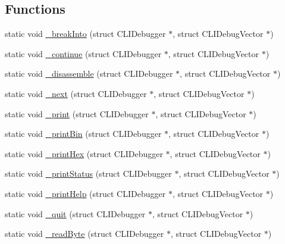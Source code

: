 \subsection*{Functions}
\begin{DoxyCompactItemize}
\item 
static void \mbox{\hyperlink{debugger_2cli-debugger_8c_ae3b40515b8220fab94d8b674d572a630}{\+\_\+break\+Into}} (struct C\+L\+I\+Debugger $\ast$, struct C\+L\+I\+Debug\+Vector $\ast$)
\item 
static void \mbox{\hyperlink{debugger_2cli-debugger_8c_ad40afb46823b93907981724d646a3f1f}{\+\_\+continue}} (struct C\+L\+I\+Debugger $\ast$, struct C\+L\+I\+Debug\+Vector $\ast$)
\item 
static void \mbox{\hyperlink{debugger_2cli-debugger_8c_a4b92eb025348b2a060a49ffffff5f07d}{\+\_\+disassemble}} (struct C\+L\+I\+Debugger $\ast$, struct C\+L\+I\+Debug\+Vector $\ast$)
\item 
static void \mbox{\hyperlink{debugger_2cli-debugger_8c_a6494b4411028b9b2f2f443f8b66dc486}{\+\_\+next}} (struct C\+L\+I\+Debugger $\ast$, struct C\+L\+I\+Debug\+Vector $\ast$)
\item 
static void \mbox{\hyperlink{debugger_2cli-debugger_8c_a87cc8a3ae9b66a7eb6ca4c6564140b39}{\+\_\+print}} (struct C\+L\+I\+Debugger $\ast$, struct C\+L\+I\+Debug\+Vector $\ast$)
\item 
static void \mbox{\hyperlink{debugger_2cli-debugger_8c_a50725d8ec0b31f2bcebf08ef23658a80}{\+\_\+print\+Bin}} (struct C\+L\+I\+Debugger $\ast$, struct C\+L\+I\+Debug\+Vector $\ast$)
\item 
static void \mbox{\hyperlink{debugger_2cli-debugger_8c_a2fde78deebc6a470f03e908a50303f36}{\+\_\+print\+Hex}} (struct C\+L\+I\+Debugger $\ast$, struct C\+L\+I\+Debug\+Vector $\ast$)
\item 
static void \mbox{\hyperlink{debugger_2cli-debugger_8c_af4bcea6a68691146acc3116bc2c5406b}{\+\_\+print\+Status}} (struct C\+L\+I\+Debugger $\ast$, struct C\+L\+I\+Debug\+Vector $\ast$)
\item 
static void \mbox{\hyperlink{debugger_2cli-debugger_8c_a3ed6b81951be65abc8107383fd7fe43e}{\+\_\+print\+Help}} (struct C\+L\+I\+Debugger $\ast$, struct C\+L\+I\+Debug\+Vector $\ast$)
\item 
static void \mbox{\hyperlink{debugger_2cli-debugger_8c_a93058b201875100e456b7b215a5bcc0a}{\+\_\+quit}} (struct C\+L\+I\+Debugger $\ast$, struct C\+L\+I\+Debug\+Vector $\ast$)
\item 
static void \mbox{\hyperlink{debugger_2cli-debugger_8c_aaca9f6a750269caaf5af45ac030d97ee}{\+\_\+read\+Byte}} (struct C\+L\+I\+Debugger $\ast$, struct C\+L\+I\+Debug\+Vector $\ast$)

\end{DoxyCompactItemize}
